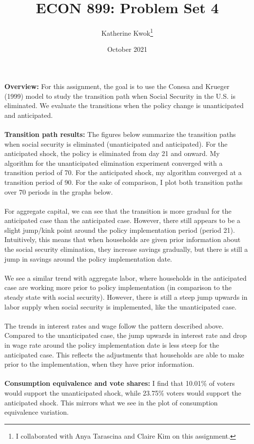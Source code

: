 \documentclass[12pt]{article}
\title{ECON 899: Problem Set 4}
\author{Katherine Kwok\footnote{I collaborated with Anya Tarascina and Claire Kim on this assignment.}}
\date{October 2021}
\begin{document}
\maketitle
\noindent \textbf{Overview:} For this assignment, the goal is to use the Conesa and Krueger (1999) model to study the transition path when Social Security in the U.S. is eliminated. We evaluate the transitions when the policy change is unanticipated and anticipated. \\\\

\noindent \textbf{Transition path results:} The figures below summarize the transition paths when social security is eliminated (unanticipated and anticipated). For the anticipated shock, the policy is eliminated from day 21 and onward. My algorithm for the unanticipated elimination experiment converged with a transition period of 70. For the anticipated shock, my algorithm converged at a transition period of 90. For the sake of comparison, I plot both transition paths over 70 periods in the graphs below. \\\\
For aggregate capital, we can see that the transition is more gradual for the anticipated case than the anticipated case. However, there still appears to be a slight jump/kink point around the policy implementation period (period 21). Intuitively, this means that when households are given prior information about the social security elimination, they increase savings gradually, but there is still a jump in savings around the policy implementation date. \\\\
We see a similar trend with aggregate labor, where households in the anticipated case are working more prior to policy implementation (in comparison to the steady state with social security). However, there is still a steep jump upwards in labor supply when social security is implemented, like the unanticipated case. \\\\
The trends in interest rates and wage follow the pattern described above. Compared to the unanticipated case, the jump upwards in interest rate and drop in wage rate around the policy implementation date is less steep for the anticipated case. This reflects the adjustments that households are able to make prior to the implementation, when they have prior information. \\\\
\noindent \textbf{Consumption equivalence and vote shares:} I find that 10.01\% of voters would support the unanticipated shock, while 23.75\% voters would support the anticipated shock. This mirrors what we see in the plot of consumption equivalence variation.
\end{document}
